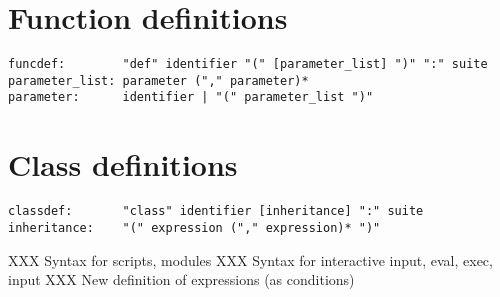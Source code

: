 \section{Function definitions}

\begin{verbatim}
funcdef:        "def" identifier "(" [parameter_list] ")" ":" suite
parameter_list: parameter ("," parameter)*
parameter:      identifier | "(" parameter_list ")"
\end{verbatim}

\section{Class definitions}

\begin{verbatim}
classdef:       "class" identifier [inheritance] ":" suite
inheritance:    "(" expression ("," expression)* ")"
\end{verbatim}

XXX Syntax for scripts, modules
XXX Syntax for interactive input, eval, exec, input
XXX New definition of expressions (as conditions)


